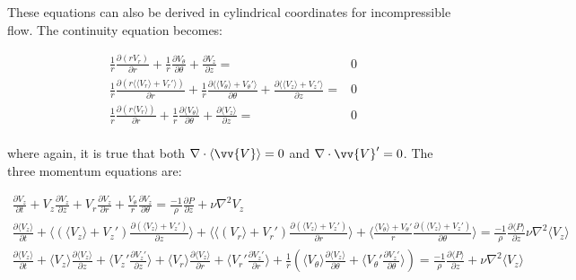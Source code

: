 \documentclass[10pt]{article}
\newcommand{\beqa}{\begin{equation}\begin{aligned}}
\newcommand{\eeqa}{\end{aligned}\end{equation}}
\newcommand{\la}{\langle}
\newcommand{\ra}{\rangle}
\begin{document}
\begin{flushleft}
These equations can also be derived in cylindrical coordinates for incompressible flow. The continuity equation becomes:

\beqa
\frac{1}{r}\frac{\partial(rV_r)}{\partial r}+\frac{1}{r}\frac{\partial V_{\theta}}{\partial\theta}+\frac{\partial V_z}{\partial z}=&0\\
\frac{1}{r}\frac{\partial(r\la\la V_r\ra+V_r'\ra)}{\partial r}+\frac{1}{r}\frac{\partial \la\la V_{\theta}\ra+V_{\theta}'\ra}{\partial\theta}+\frac{\partial \la\la V_z\ra+V_z'\ra}{\partial z}=&0\\
\frac{1}{r}\frac{\partial(r\la V_r\ra)}{\partial r}+\frac{1}{r}\frac{\partial \la V_{\theta}\ra}{\partial\theta}+\frac{\partial \la V_z\ra}{\partial z}=&0\\
\eeqa

where again, it is true that both \(\nabla\cdot\la \vv{V}\ra=0\) and \(\nabla\cdot\vv{V}'=0\). The three momentum equations are:

\beqa
\frac{\partial V_z}{\partial t}+V_z\frac{\partial V_z}{\partial z}+V_r\frac{\partial V_z}{\partial r}+\frac{V_{\theta}}{r}\frac{\partial V_z}{\partial\theta}=\frac{-1}{\rho}\frac{\partial P}{\partial z}+\nu\nabla^2 V_z\\
\frac{\partial \la V_z\ra}{\partial t}+\la (\la V_z\ra + V_z')\frac{\partial (\la V_z\ra + V_z')}{\partial z}\ra+\la \la (V_r\ra+V_r')\frac{\partial (\la V_z\ra + V_z')}{\partial r}\ra+\la\frac{\la V_{\theta}\ra+V_{\theta}'}{r}\frac{\partial (\la V_z\ra + V_z')}{\partial\theta}\ra=\frac{-1}{\rho}\frac{\partial \la P\ra}{\partial z}\nu\nabla^2\la V_z\ra\\
\frac{\partial \la V_z\ra}{\partial t}+\la V_z\ra\frac{\partial \la V_z\ra}{\partial z}+\la V_z'\frac{\partial V_z'}{\partial z}\ra+\la V_r\ra\frac{\partial \la V_z\ra}{\partial r}+\la V_r'\frac{\partial V_z'}{\partial r}\ra+\frac{1}{r}\left(\la V_{\theta}\ra\frac{\partial\la V_z\ra}{\partial\theta}+\la V_{\theta}'\frac{\partial V_z'}{\partial \theta}\ra\right)=\frac{-1}{\rho}\frac{\partial \la P\ra}{\partial z}+\nu\nabla^2\la V_z\ra\\
\eeqa


\end{flushleft}
\end{document}
